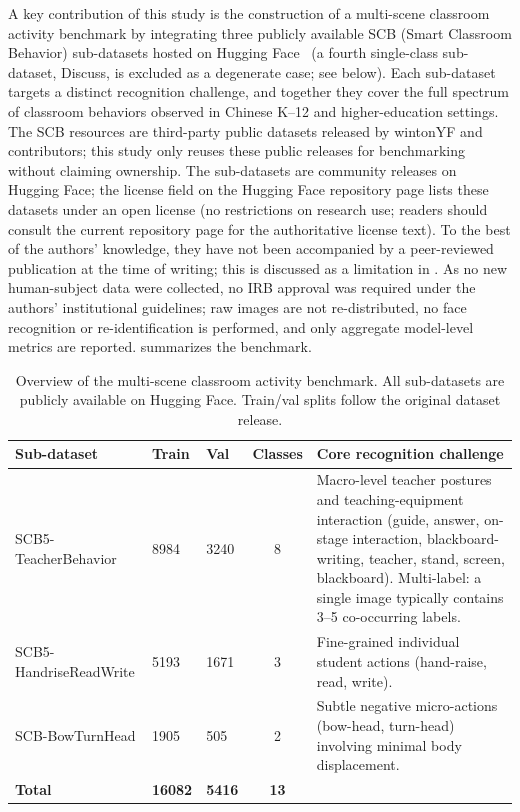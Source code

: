 \documentclass[electronics,article,submit,pdftex,moreauthors]{Definitions/mdpi}
\begin{document}
A key contribution of this study is the construction of a multi-scene classroom activity benchmark by integrating three publicly available SCB (Smart Classroom Behavior) sub-datasets hosted on Hugging Face~\cite{scb_dataset} (a fourth single-class sub-dataset, Discuss, is excluded as a degenerate case; see below).
Each sub-dataset targets a distinct recognition challenge, and together they cover the full spectrum of classroom behaviors observed in Chinese K--12 and higher-education settings.
The SCB resources are third-party public datasets released by wintonYF and contributors; this study only reuses these public releases for benchmarking without claiming ownership. The sub-datasets are community releases on Hugging Face; the license field on the Hugging Face repository page lists these datasets under an open license (no restrictions on research use; readers should consult the current repository page for the authoritative license text). To the best of the authors' knowledge, they have not been accompanied by a peer-reviewed publication at the time of writing; this is discussed as a limitation in . As no new human-subject data were collected, no IRB approval was required under the authors' institutional guidelines; raw images are not re-distributed, no face recognition or re-identification is performed, and only aggregate model-level metrics are reported.
 summarizes the benchmark.

\begin{table}[H]
\caption{Overview of the multi-scene classroom activity benchmark. All sub-datasets are publicly available on Hugging Face. Train/val splits follow the original dataset release.}
\label{tab:benchmark_overview}
\centering
\small
\begin{tabular}{p{2.8cm}p{1.1cm}p{1.1cm}cp{5.0cm}}
\toprule
\textbf{Sub-dataset} & \textbf{Train} & \textbf{Val} & \textbf{Classes} & \textbf{Core recognition challenge} \\
\midrule
SCB5-TeacherBehavior & 8984 & 3240 & 8 & Macro-level teacher postures and teaching-equipment interaction (guide, answer, on-stage interaction, blackboard-writing, teacher, stand, screen, blackboard). Multi-label: a single image typically contains 3--5 co-occurring labels. \\
\addlinespace
SCB5-HandriseReadWrite & 5193 & 1671 & 3 & Fine-grained individual student actions (hand-raise, read, write). \\
\addlinespace
SCB-BowTurnHead & 1905 & 505 & 2 & Subtle negative micro-actions (bow-head, turn-head) involving minimal body displacement. \\
\midrule
\textbf{Total} & \textbf{16082} & \textbf{5416} & \textbf{13} & \\
\bottomrule
\end{tabular}
\end{table}
\end{document}
